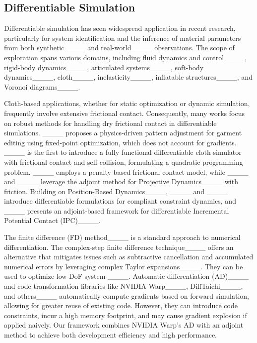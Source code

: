 \subsection{Differentiable Simulation}

Differentiable simulation has seen widespread application in recent research, particularly for system identification and the inference of material parameters from both synthetic____ and real-world____ observations. The scope of exploration spans various domains, including fluid dynamics and control____, rigid-body dynamics____, articulated systems____, soft-body dynamics____, cloth____, inelasticity____, inflatable structures____, and Voronoi diagrams____.

Cloth-based applications, whether for static optimization or dynamic simulation, frequently involve extensive frictional contact. Consequently, many works focus on robust methods for handling dry frictional contact in differentiable simulations. ____ proposes a physics-driven pattern adjustment for garment editing using fixed-point optimization, which does not account for gradients. ____ is the first to introduce a fully functional differentiable cloth simulator with frictional contact and self-collision, formulating a quadratic programming problem. ____ employs a penalty-based frictional contact model, while ____ and ____ leverage the adjoint method for Projective Dynamics____ with friction. Building on Position-Based Dynamics____, ____ and ____ introduce differentiable formulations for compliant constraint dynamics, and ____ presents an adjoint-based framework for differentiable Incremental Potential Contact (IPC)____.


The finite difference (FD) method____ is a standard approach to numerical differentiation. The complex-step finite difference technique____ offers an alternative that mitigates issues such as subtractive cancellation and accumulated numerical errors by leveraging complex Taylor expansions____. They can be used to optimize low-DoF system ____. Automatic differentiation (AD)____ and code transformation libraries like NVIDIA Warp____, DiffTaichi____, and others____ automatically compute gradients based on forward simulation, allowing for greater reuse of existing code. However, they can introduce code constraints, incur a high memory footprint, and may cause gradient explosion if applied naively. Our framework combines NVIDIA Warp’s AD with an adjoint method to achieve both development efficiency and high performance.